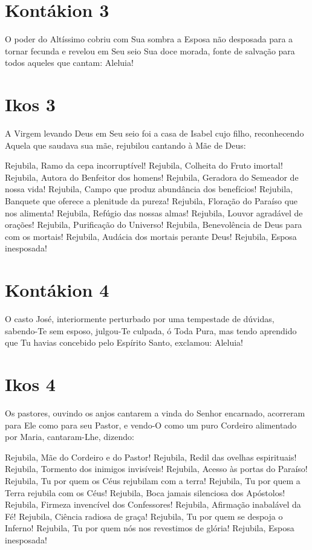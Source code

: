 \documentclass{subfiles}
\begin{document}
\section*{Kontákion 3}

O poder do Altíssimo cobriu com Sua sombra a Esposa não desposada
para a tornar fecunda e revelou em Seu seio Sua doce morada, fonte de
salvação para todos aqueles que cantam: Aleluia!

\section*{Ikos 3}

A Virgem levando Deus em Seu seio foi a casa de Isabel cujo filho,
reconhecendo Aquela que saudava sua mãe, rejubilou cantando à Mãe de
Deus:

Rejubila, Ramo da cepa incorruptível!
Rejubila, Colheita do Fruto imortal!
Rejubila, Autora do Benfeitor dos homens!
Rejubila, Geradora do Semeador de nossa vida!
Rejubila, Campo que produz abundância dos benefícios!
Rejubila, Banquete que oferece a plenitude da pureza!
Rejubila, Floração do Paraíso que nos alimenta!
Rejubila, Refúgio das nossas almas!
Rejubila, Louvor agradável de orações!
Rejubila, Purificação do Universo!
Rejubila, Benevolência de Deus para com os mortais!
Rejubila, Audácia dos mortais perante Deus!
Rejubila, Esposa inesposada!

\section*{Kontákion 4}

O casto José, interiormente perturbado por uma tempestade de
dúvidas, sabendo-Te sem esposo, julgou-Te culpada, ó Toda Pura, mas tendo
aprendido que Tu havias concebido pelo Espírito Santo, exclamou: Aleluia!

\section*{Ikos 4}

Os pastores, ouvindo os anjos cantarem a vinda do Senhor encarnado,
acorreram para Ele como para seu Pastor, e vendo-O como um puro Cordeiro
alimentado por Maria, cantaram-Lhe, dizendo:

Rejubila, Mãe do Cordeiro e do Pastor!
Rejubila, Redil das ovelhas espirituais!
Rejubila, Tormento dos inimigos invisíveis!
Rejubila, Acesso às portas do Paraíso!
Rejubila, Tu por quem os Céus rejubilam com a terra!
Rejubila, Tu por quem a Terra rejubila com os Céus!
Rejubila, Boca jamais silenciosa dos Apóstolos!
Rejubila, Firmeza invencível dos Confessores!
Rejubila, Afirmação inabalável da Fé!
Rejubila, Ciência radiosa de graça!
Rejubila, Tu por quem se despoja o Inferno!
Rejubila, Tu por quem nós nos revestimos de glória!
Rejubila, Esposa inesposada!
\end{document}
